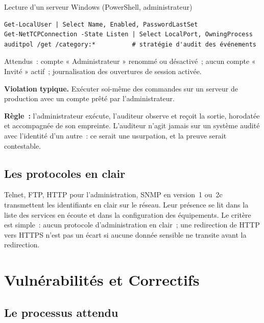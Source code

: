 \begin{boxoutils}{Lecture d'un serveur Windows (PowerShell, administrateur)}
\begin{lstlisting}[language=bash_forensique]
Get-LocalUser | Select Name, Enabled, PasswordLastSet
Get-NetTCPConnection -State Listen | Select LocalPort, OwningProcess
auditpol /get /category:*          # stratégie d'audit des événements
\end{lstlisting}
Attendus~: compte « Administrateur » renommé ou désactivé~; aucun compte
« Invité » actif~; journalisation des ouvertures de session activée.
\end{boxoutils}

\begin{boxalert}
\textbf{Violation typique.} Exécuter soi-même des commandes sur un serveur
de production avec un compte prêté par l'administrateur.

\smallskip
\textbf{Règle~:} l'administrateur exécute, l'auditeur observe et reçoit la
sortie, horodatée et accompagnée de son empreinte. L'auditeur n'agit jamais
sur un système audité avec l'identité d'un autre~: ce serait une
usurpation, et la preuve serait contestable.
\end{boxalert}

\subsection{Les protocoles en clair}

Telnet, FTP, HTTP pour l'administration, SNMP en version~1 ou~2c
transmettent les identifiants en clair sur le réseau. Leur présence se lit
dans la liste des services en écoute et dans la configuration des
équipements. Le critère est simple~: aucun protocole d'administration en
clair~; une redirection de HTTP vers HTTPS n'est pas un écart si aucune
donnée sensible ne transite avant la redirection.

\section{Vulnérabilités et Correctifs}
\label{sec:c21-vuln}

\subsection{Le processus attendu}

